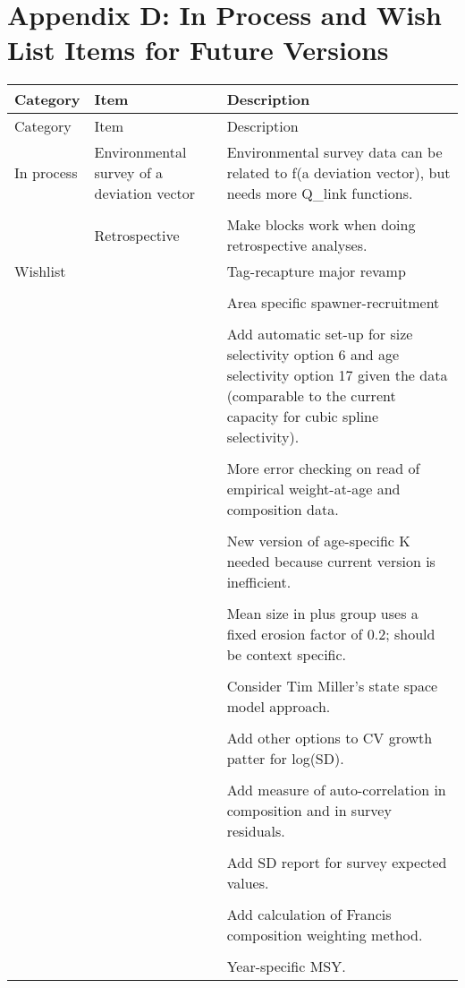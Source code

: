 \section{Appendix D: In Process and Wish List Items for Future Versions}

\begin{center}
	\begin{longtable}{p{2cm} p{3cm} p{10cm}}
		Category & Item & Description\\
		\hline
		\endfirsthead
				
		Category & Item & Description\\
		\hline
		\endhead
				
		\hline
		\endfoot
				
		\endlastfoot
		
		In process 
		  &	Environmental survey of a deviation vector & Environmental survey data can be related to f(a deviation vector), but needs more Q\_link functions.\\
		  \\
		  & Retrospective & Make blocks work when doing retrospective analyses. \\
		
		\hline
		Wishlist & &
			 Tag-recapture major revamp\\\\
	     & & Area specific spawner-recruitment \\\\
	     & & Add automatic set-up for size selectivity option 6 and age selectivity option 17 given the data (comparable to the current capacity for cubic spline selectivity).\\\\
	     & & More error checking on read of empirical weight-at-age and composition data. \\\\
	     & & New version of age-specific K needed because current version is inefficient.\\\\
	     & & Mean size in plus group uses a fixed erosion factor of 0.2; should be context specific. \\\\
	     & & Consider Tim Miller's state space model approach. \\\\
	     & & Add other options to CV growth patter for log(SD). \\\\
	     & & Add measure of auto-correlation in composition and in survey residuals.\\\\
	     & & Add SD report for survey expected values. \\\\
	     & & Add calculation of Francis composition weighting method. \\\\
	     & & Year-specific MSY.	     	   \\	  	  				
		\hline
	\end{longtable}
\end{center}

